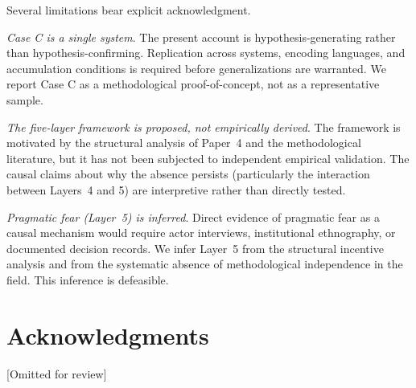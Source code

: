 \documentclass[12pt]{article}
\begin{document}
Several limitations bear explicit acknowledgment.

\textit{Case C is a single system}. The present account is hypothesis-generating rather than hypothesis-confirming. Replication across systems, encoding languages, and accumulation conditions is required before generalizations are warranted. We report Case C as a methodological proof-of-concept, not as a representative sample.

\textit{The five-layer framework is proposed, not empirically derived}. The framework is motivated by the structural analysis of Paper~4 and the methodological literature, but it has not been subjected to independent empirical validation. The causal claims about why the absence persists (particularly the interaction between Layers~4 and 5) are interpretive rather than directly tested.

\textit{Pragmatic fear (Layer~5) is inferred}. Direct evidence of pragmatic fear as a causal mechanism would require actor interviews, institutional ethnography, or documented decision records. We infer Layer~5 from the structural incentive analysis and from the systematic absence of methodological independence in the field. This inference is defeasible.

\section*{Acknowledgments}

[Omitted for review]



\end{document}
